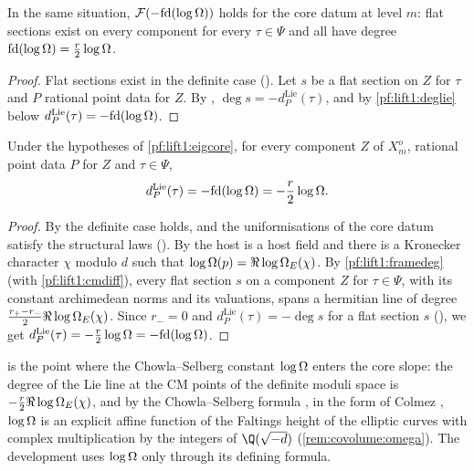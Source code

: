 \begin{proposition}\label{pf:lift1:flatcore}
In the same situation, $\mathcal F(-\mathrm{fd}(\log\Omega))$ holds for the core datum at
level $m$: flat sections exist on every component for every $\tau\in\Psi$ and all have degree
$\mathrm{fd}(\log\Omega)=\frac r2\log\Omega$.
\end{proposition}

\begin{proof}
Flat sections exist in the definite case
(). Let $s$ be a flat section on $Z$ for
$\tau$ and $P$ rational point data for $Z$. By
, $\deg s=-d^{\mathrm{Lie}}_P(\tau)$,
and by \cref{pf:lift1:deglie} below $d^{\mathrm{Lie}}_P(\tau)=-\mathrm{fd}(\log\Omega)$.
\end{proof}

\begin{proposition}\label{pf:lift1:deglie}
Under the hypotheses of \cref{pf:lift1:eigcore}, for every component $Z$ of $X^o_m$, rational point
data $P$ for $Z$ and $\tau\in\Psi$,
\[
d^{\mathrm{Lie}}_P(\tau)=-\mathrm{fd}(\log\Omega)=-\frac r2\log\Omega.
\]
\end{proposition}

\begin{proof}
By  the definite case holds, and the uniformisations of
the core datum satisfy the structural laws (). By
 the host is a host field and
there is a Kronecker character $\chi$ modulo $d$ such that $\log\Omega(p)=\Re\log\Omega_E(\chi)$. By
\cref{pf:lift1:framedeg} (with \cref{pf:lift1:cmdiff}), every flat section $s$ on a component $Z$ for
$\tau\in\Psi$, with its constant archimedean norms and its valuations, spans a hermitian line of degree
$\frac{r_+-r_-}2\Re\log\Omega_E(\chi)$. Since $r_-=0$ and
$d^{\mathrm{Lie}}_P(\tau)=-\deg s$ for a flat section $s$
(), we get
$d^{\mathrm{Lie}}_P(\tau)=-\frac r2\log\Omega=-\mathrm{fd}(\log\Omega)$.
\end{proof}

\begin{remark}
 is the point where the Chowla--Selberg constant $\log\Omega$ enters the core
slope: the degree of the Lie line at the CM points of the definite moduli space is $-\frac r2\Re
\log\Omega_E(\chi)$, and by the Chowla--Selberg formula \cite{ChowlaSelberg1967}, in the form of
Colmez \cite{Colmez1993}, $\log\Omega$ is an explicit affine function of the Faltings height of the
elliptic curves with complex multiplication by the integers of $\Q(\sqrt{-d})$
(\cref{rem:covolume:omega}). The development uses $\log\Omega$ only through its defining formula.
\end{remark}

